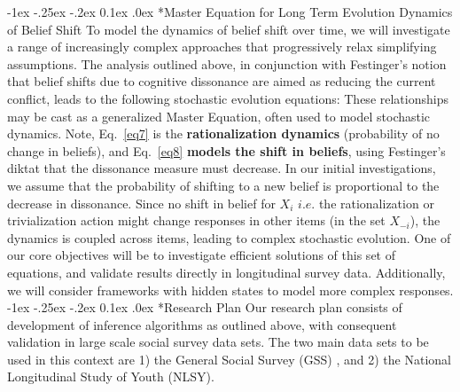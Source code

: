 \documentclass[onecolumn, compsoc,11pt]{IEEEtran}
\makeatletter
\renewcommand\subsection{\@startsection {section}{1}{\z@}%
                                   {-1ex \@plus -.25ex \@minus -.2ex}%
                                   {0.1ex \@plus.0ex}%
                                   {\fontsize{11}{10}\selectfont\bfseries\sffamily\color{DodgerBlue4}}}
\makeatother
\begin{document}
\subsection*{Master Equation for Long Term Evolution Dynamics of Belief Shift}
To model the dynamics of belief shift over time, we will investigate a range of increasingly complex  approaches that progressively relax simplifying assumptions.
The analysis outlined above, in conjunction with Festinger's notion that belief shifts due to cognitive dissonance are aimed as reducing the current conflict, leads to the following stochastic evolution equations:
\noindent These relationships may be cast as a generalized Master Equation, often used to model stochastic dynamics. Note, Eq.~\eqref{eq7} is the \textbf{rationalization dynamics} (probability of no change in beliefs), and Eq.~\eqref{eq8} \textbf{models the shift in beliefs}, using Festinger's diktat that the dissonance measure must decrease. In our initial investigations, we assume that the probability of shifting to a new belief is proportional to the decrease in dissonance. Since no shift in belief for $X_i$ $i.e.$ the rationalization or trivialization action might change responses in other items (in the set $X_{-i}$), the dynamics is  coupled across items, leading to  complex stochastic evolution. One of our core objectives will be to investigate efficient solutions of this set of equations, and validate  results directly in longitudinal survey data.    Additionally, we will consider  frameworks with hidden states to model more complex responses.                           
\subsection*{Research Plan}
Our research plan consists of  development of inference algorithms as outlined above, with  consequent validation in large scale social survey data sets. The two main data sets to be used in this context are 1) the General Social Survey (GSS) , and 2) the National Longitudinal Study of Youth (NLSY).
%
\end{document}
